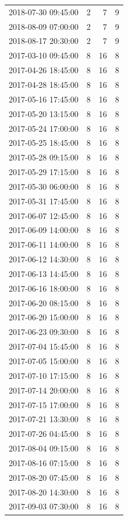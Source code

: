 \begin{tabular}{lrrr}
2018-07-30 09:45:00 & 2 & 7 & 9 \\
2018-08-09 07:00:00 & 2 & 7 & 9 \\
2018-08-17 20:30:00 & 2 & 7 & 9 \\
2017-03-10 09:45:00 & 8 & 16 & 8 \\
2017-04-26 18:45:00 & 8 & 16 & 8 \\
2017-04-28 18:45:00 & 8 & 16 & 8 \\
2017-05-16 17:45:00 & 8 & 16 & 8 \\
2017-05-20 13:15:00 & 8 & 16 & 8 \\
2017-05-24 17:00:00 & 8 & 16 & 8 \\
2017-05-25 18:45:00 & 8 & 16 & 8 \\
2017-05-28 09:15:00 & 8 & 16 & 8 \\
2017-05-29 17:15:00 & 8 & 16 & 8 \\
2017-05-30 06:00:00 & 8 & 16 & 8 \\
2017-05-31 17:45:00 & 8 & 16 & 8 \\
2017-06-07 12:45:00 & 8 & 16 & 8 \\
2017-06-09 14:00:00 & 8 & 16 & 8 \\
2017-06-11 14:00:00 & 8 & 16 & 8 \\
2017-06-12 14:30:00 & 8 & 16 & 8 \\
2017-06-13 14:45:00 & 8 & 16 & 8 \\
2017-06-16 18:00:00 & 8 & 16 & 8 \\
2017-06-20 08:15:00 & 8 & 16 & 8 \\
2017-06-20 15:00:00 & 8 & 16 & 8 \\
2017-06-23 09:30:00 & 8 & 16 & 8 \\
2017-07-04 15:45:00 & 8 & 16 & 8 \\
2017-07-05 15:00:00 & 8 & 16 & 8 \\
2017-07-10 17:15:00 & 8 & 16 & 8 \\
2017-07-14 20:00:00 & 8 & 16 & 8 \\
2017-07-15 17:00:00 & 8 & 16 & 8 \\
2017-07-21 13:30:00 & 8 & 16 & 8 \\
2017-07-26 04:45:00 & 8 & 16 & 8 \\
2017-08-04 09:15:00 & 8 & 16 & 8 \\
2017-08-16 07:15:00 & 8 & 16 & 8 \\
2017-08-20 07:45:00 & 8 & 16 & 8 \\
2017-08-20 14:30:00 & 8 & 16 & 8 \\
2017-09-03 07:30:00 & 8 & 16 & 8 \\

\end{tabular}
